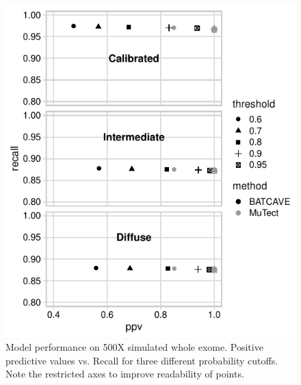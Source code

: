 \documentclass[a4,center,fleqn]{NAR}
\begin{document}
  
\begin{figure}
  \begin{center}
  \includegraphics{figures/ppv_wgs.pdf}
  \end{center}
  \caption{Model performance on 500X simulated whole exome. 
  Positive predictive values vs. Recall for three different probability cutoffs. 
  Note the restricted axes to improve readability of points.}
\label{NAR-ppv_wgs_fig}
\end{figure}
\end{document}
